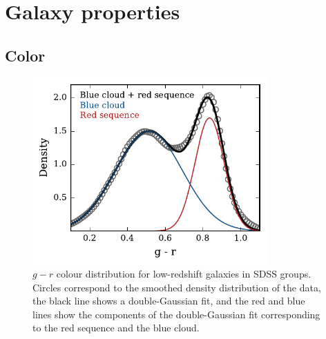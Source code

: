 \section{Galaxy properties}
\label{sec:gal_properties}

\subsection{Color}
\label{sec:color}

\begin{figure}[!ht]
  \centering
  \includegraphics[width=0.8\textwidth]{gr_dist.pdf}
  \caption[$g-r$ coloud distribution for SDSS group galaxies]{$g-r$
    colour distribution for low-redshift galaxies in 
    SDSS groups.  Circles correspond to the smoothed density
    distribution of the data, the black line shows a double-Gaussian
    fit, and the red and blue lines show the components of the
    double-Gaussian fit corresponding to the red sequence and the blue
  cloud.}
  \label{fig:gr_dist}
\end{figure}

